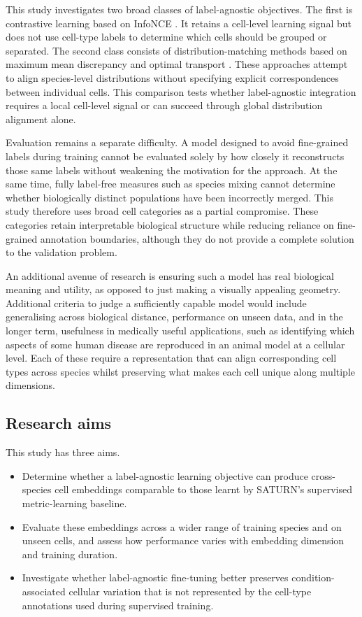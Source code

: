 \documentclass{article}
\begin{document}
This study investigates two broad classes of label-agnostic objectives. The first is contrastive learning based on InfoNCE \cite{InfoNCE}. It retains a cell-level learning signal but does not use cell-type labels to determine which cells should be grouped or separated. The second class consists of distribution-matching methods based on maximum mean discrepancy \cite{MMD-MA} and optimal transport \cite{OT}. These approaches attempt to align species-level distributions without specifying explicit correspondences between individual cells. This comparison tests whether label-agnostic integration requires a local cell-level signal or can succeed through global distribution alignment alone.

Evaluation remains a separate difficulty. A model designed to avoid fine-grained labels during training cannot be evaluated solely by how closely it reconstructs those same labels without weakening the motivation for the approach. At the same time, fully label-free measures such as species mixing cannot determine whether biologically distinct populations have been incorrectly merged. This study therefore uses broad cell categories as a partial compromise. These categories retain interpretable biological structure while reducing reliance on fine-grained annotation boundaries, although they do not provide a complete solution to the validation problem.

An additional avenue of research is ensuring such a model has real biological meaning and utility, as opposed to just making a visually appealing geometry. Additional criteria to judge a sufficiently capable model would include generalising across biological distance, performance on unseen data, and in the longer term, usefulness in medically useful applications, such as identifying which aspects of some human disease are reproduced in an animal model at a cellular level. Each of these require a representation that can align corresponding cell types across species whilst preserving what makes each cell unique along multiple dimensions. 

\subsection{Research aims}

This study has three aims.

\begin{itemize}
    \item Determine whether a label-agnostic learning objective can produce cross-species cell embeddings comparable to those learnt by SATURN’s supervised metric-learning baseline.
    \item Evaluate these embeddings across a wider range of training species and on unseen cells, and assess how performance varies with embedding dimension and training duration.
    \item Investigate whether label-agnostic fine-tuning better preserves condition-associated cellular variation that is not represented by the cell-type annotations used during supervised training.
\end{itemize}
\end{document}
